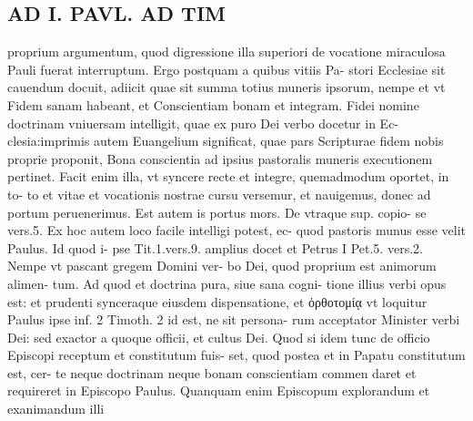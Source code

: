 \documentclass{article}
\begin{document}
\begin{pages}
\section*{AD I. PAVL. AD TIM }
\marginpar{[ p.34 ]}\pstart proprium argumentum, quod digressione illa superiori de vocatione miraculosa Pauli fuerat interruptum. Ergo postquam a quibus vitiis Pa- stori Ecclesiae sit cauendum docuit, adiicit quae sit summa totius muneris ipsorum, nempe et vt Fidem sanam habeant, et Conscientiam bonam et integram. Fidei nomine doctrinam vniuersam intelligit, quae ex puro Dei verbo docetur in Ec- clesia:imprimis autem Euangelium significat, quae pars Scripturae fidem nobis proprie proponit, Bona conscientia ad ipsius pastoralis muneris executionem pertinet. Facit enim illa, vt syncere recte et integre, quemadmodum oportet, in to- to et vitae et vocationis nostrae cursu versemur, et nauigemus, donec ad portum peruenerimus. Est autem is portus mors. De vtraque sup. copio- se vers.5.  \pend\pstart Ex hoc autem loco facile intelligi potest, ec- quod pastoris munus esse velit Paulus. Id quod i- pse Tit.1.vers.9. amplius docet et Petrus I Pet.5. vers.2. Nempe vt pascant gregem Domini ver- bo Dei, quod proprium est animorum alimen- tum. Ad quod et doctrina pura, siue sana cogni- tione illius verbi opus est: et prudenti synceraque eiusdem dispensatione, et ὀρθοτομίᾳ vt loquitur Paulus ipse inf. 2 Timoth. 2 id est, ne sit persona- rum acceptator Minister verbi Dei: sed exactor a quoque officii, et cultus Dei. Quod si idem tunc de officio Episcopi receptum et constitutum fuis- set, quod postea et in Papatu constitutum est, cer- te neque  doctrinam neque bonam conscientiam commen daret et requireret in Episcopo Paulus. Quanquam enim Episcopum explorandum et exanimandum illi  \pend

\end{pages}
\end{document}
